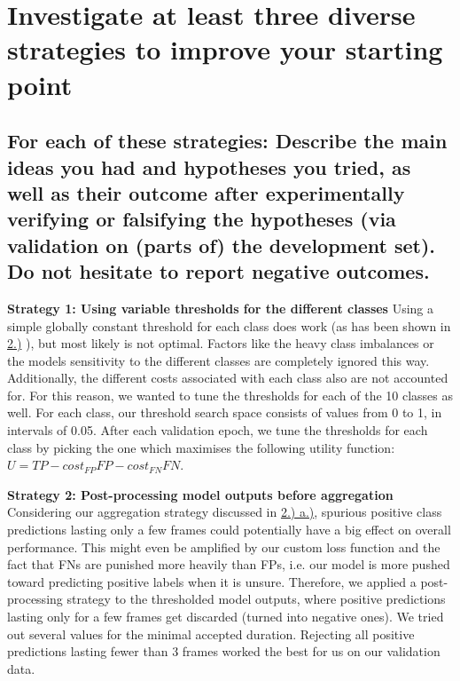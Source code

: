 
\section{Investigate at least three diverse strategies to improve your starting point}
\label{sec:Investigate diverse strategies}




\subsection{For each of these strategies: Describe the main ideas you had and hypotheses you tried, as well as their outcome after experimentally verifying or falsifying the hypotheses (via validation on (parts of) the development set). Do not hesitate to report negative outcomes.}
\label{sec:Investigate:a}

\textbf{Strategy 1: Using variable thresholds for the different classes}
\newline
Using a simple globally constant threshold for each class does work (as has been shown in \hyperref[sec:Build a simple SED system]{2.)} ), but most likely is not optimal. Factors like the heavy class imbalances or the models sensitivity to the different classes are completely ignored this way. Additionally, the different costs associated with each class also are not accounted for.
\newline
For this reason, we wanted to tune the thresholds for each of the 10 classes as well. For each class, our threshold search space consists of values from 0 to 1, in intervals of 0.05. After each validation epoch, we tune the thresholds for each class by picking the one which maximises the following utility function: $U = TP - cost_{FP}FP - cost_{FN}FN$.

\textbf{Strategy 2: Post-processing model outputs before aggregation}
\newline
Considering our aggregation strategy discussed in \hyperref[sec:Build:a]{2.) a.)}, spurious positive class predictions lasting only a few frames could potentially have a big effect on overall performance. This might even be amplified by our custom loss function and the fact that FNs are punished more heavily than FPs, i.e. our model is more pushed toward predicting positive labels when it is unsure.
\newline
Therefore, we applied a post-processing strategy to the thresholded model outputs, where positive predictions lasting only for a few frames get discarded (turned into negative ones). We tried out several values for the minimal accepted duration. Rejecting all positive predictions lasting fewer than 3 frames worked the best for us on our validation data.



